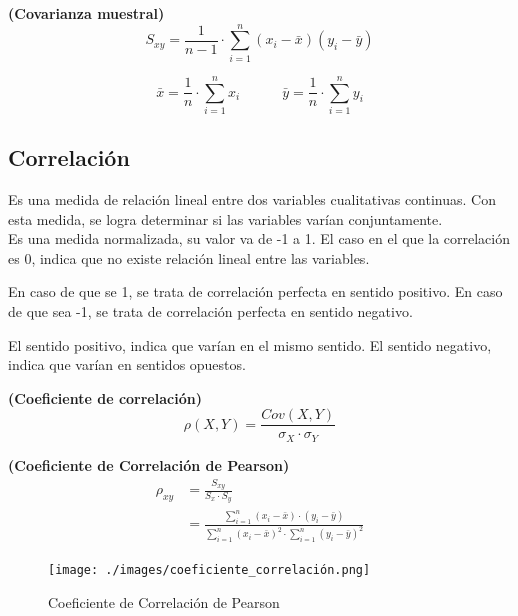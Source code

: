 \documentclass[../main.tex]{subfiles}
\begin{document}
        \begin{definition} \textbf{(Covarianza muestral)} 
            \begin{equation}
                S_{xy} = \frac{1}{n-1} \cdot \sum_{i=1}^{n}(x_i - \bar{x})(y_i - \bar{y})
            \end{equation}

            \begin{equation}
                \bar{x} = \frac{1}{n} \cdot \sum_{i=1}^{n} x_i \quad  \quad \quad \bar{y} = \frac{1}{n} \cdot \sum_{i=1}^{n} y_i
            \end{equation}
        \end{definition}
        
    \subsection{Correlación}
        Es una medida de relación lineal entre dos variables cualitativas continuas. Con esta medida, se logra determinar si las variables varían conjuntamente. \\

        Es una medida normalizada, su valor va de -1 a 1. El caso en el que la correlación es 0, indica que no existe relación lineal entre las variables.

        En caso de que se 1, se trata de correlación perfecta en sentido positivo. En caso de que sea -1, se trata de correlación perfecta en sentido negativo.

        El sentido positivo, indica que varían en el mismo sentido. El sentido negativo, indica que varían en sentidos opuestos.

        \begin{definition} \textbf{(Coeficiente de correlación)}
            \begin{equation}
                \rho(X,Y) = \frac{Cov(X,Y)}{\sigma_X \cdot \sigma_Y}
            \end{equation}
            
        \end{definition}

        \begin{definition} \textbf{(Coeficiente de Correlación de Pearson)}
            \begin{equation}
                \begin{split}
                    \rho_{xy} &= \frac{S_{xy}}{S_x \cdot S_y}
                    \\&= \frac{\sum_{i=1}^{n} (x_i - \bar{x}) \cdot (y_i - \bar{y})}{\sum_{i=1}^{n} (x_i - \bar{x})^2 \cdot \sum_{i=1}^{n} (y_i - \bar{y})^2}
                \end{split}
            \end{equation}

            \begin{figure}[h]
                \centering
                \texttt{[image: ./images/coeficiente\_correlación.png]}
                \caption{Coeficiente de Correlación de Pearson}
                \label{fig:coeficiente_correlación}
            \end{figure}
        \end{definition}
\end{document}
